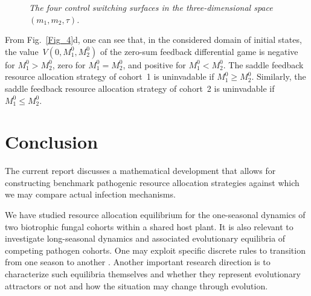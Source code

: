 \documentclass[11pt]{amsart}
\begin{document}
\begin{figure}
\bf \caption{\it The four control switching surfaces in the three-dimensional space~$ (m_1, m_2, \tau) $.}
\label{Fig_7}
\end{figure}

From Fig.~{\rm \ref{Fig_4}d,} one can see that{\rm ,} in the considered domain of initial states{\rm ,}
the value~$ V \left( 0, M_1^0, M_2^0 \right) $ of the zero-sum feedback differential game is negative for
$ M_1^0 > M_2^0 ${\rm ,} zero for $ M_1^0 = M_2^0 ${\rm ,} and positive for $ M_1^0 < M_2^0 $. The saddle feedback
resource allocation strategy of cohort~{\rm 1} is uninvadable if $ M_1^0 \geqslant M_2^0 $. Similarly{\rm ,}
the saddle feedback resource allocation strategy of cohort~{\rm 2} is uninvadable if $ M_1^0 \leqslant M_2^0 $.



\section{Conclusion}

The current report discusses a mathematical development that allows for constructing benchmark pathogenic resource
allocation strategies against which we may compare actual infection mechanisms.

We have studied resource allocation equilibrium for the one-seasonal dynamics of two biotrophic fungal cohorts within a shared host
plant. It is also relevant to investigate long-seasonal dynamics and associated evolutionary equilibria of competing pathogen
cohorts. One may exploit specific discrete rules to transition from one season to another \cite{MailleretLemesle2009,Akhmetzhanov2012}.
Another important research direction is to characterize such equilibria themselves and whether they represent evolutionary
attractors or not and how the situation may change through evolution. 
\end{document}
